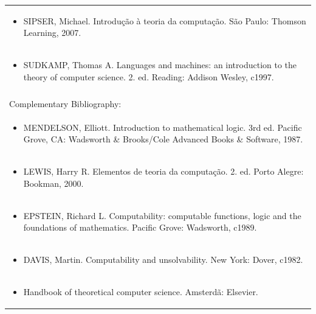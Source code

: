 \documentclass[11pt]{article}
\begin{document}
\begin{center}
\begin{longtable}{|p{4cm}|p{4cm}|p{4cm}|p{4cm}|}
\multicolumn{4}{|p{\dimexpr 16cm + 6\tabcolsep\relax}|}{\begin{itemize}\item SIPSER, Michael. Introdução à teoria da computação. São Paulo: Thomson Learning, 2007.\end{itemize}}\\
\multicolumn{4}{|p{\dimexpr 16cm + 6\tabcolsep\relax}|}{\begin{itemize}\item SUDKAMP, Thomas A. Languages and machines: an introduction to the theory of computer science. 2. ed. Reading: Addison Wesley, c1997.\end{itemize}}\\
\multicolumn{4}{|p{16cm}|}{}\\
\hline
\multicolumn{4}{|p{16cm}|}{Complementary Bibliography:}\\*
\multicolumn{4}{|p{\dimexpr 16cm + 6\tabcolsep\relax}|}{\begin{itemize}\item MENDELSON, Elliott. Introduction to mathematical logic. 3rd ed. Pacific Grove, CA: Wadsworth \& Brooks/Cole Advanced Books \& Software, 1987.\end{itemize}}\\
\multicolumn{4}{|p{\dimexpr 16cm + 6\tabcolsep\relax}|}{\begin{itemize}\item LEWIS, Harry R. Elementos de teoria da computação. 2. ed. Porto Alegre: Bookman, 2000.\end{itemize}}\\
\multicolumn{4}{|p{\dimexpr 16cm + 6\tabcolsep\relax}|}{\begin{itemize}\item EPSTEIN, Richard L. Computability: computable functions, logic and the foundations of mathematics. Pacific Grove: Wadsworth, c1989.\end{itemize}}\\
\multicolumn{4}{|p{\dimexpr 16cm + 6\tabcolsep\relax}|}{\begin{itemize}\item DAVIS, Martin. Computability and unsolvability. New York: Dover, c1982.\end{itemize}}\\
\multicolumn{4}{|p{\dimexpr 16cm + 6\tabcolsep\relax}|}{\begin{itemize}\item Handbook of theoretical computer science. Amsterdã: Elsevier.\end{itemize}}\\
\hline
\end{longtable}
\end{center}
\end{document}
